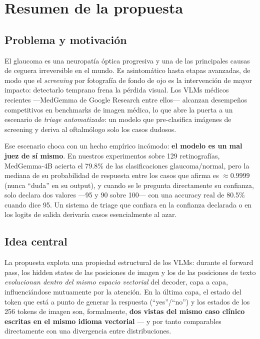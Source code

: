 \documentclass[12pt,a4paper]{article}
\begin{document}
\newpage
\tableofcontents
\newpage

\section{Resumen de la propuesta}

\subsection{Problema y motivación}

El glaucoma es una neuropatía óptica progresiva y una de las principales
causas de ceguera irreversible en el mundo. Es asintomático hasta etapas
avanzadas, de modo que el \emph{screening} por fotografía de fondo de ojo
es la intervención de mayor impacto: detectarlo temprano frena la pérdida
visual. Los VLMs médicos recientes ---MedGemma de Google Research entre
ellos--- alcanzan desempeños competitivos en benchmarks de imagen médica,
lo que abre la puerta a un escenario de \emph{triage automatizado}: un
modelo que pre-clasifica imágenes de screening y deriva al oftalmólogo
solo los casos dudosos.

Ese escenario choca con un hecho empírico incómodo: \textbf{el modelo es
un mal juez de sí mismo}. En nuestros experimentos sobre 129 retinografías,
MedGemma-4B acierta el 79.8\% de las clasificaciones glaucoma/normal, pero
la mediana de su probabilidad de respuesta entre los casos que afirma es
$\approx 0.9999$ (nunca ``duda'' en su output), y cuando se le pregunta
directamente su confianza, solo declara dos valores ---95 y 90 sobre
100--- con una accuracy real de 80.5\% cuando dice 95. Un sistema de triage
que confiara en la confianza declarada o en los logits de salida derivaría
casos esencialmente al azar.

\subsection{Idea central}

La propuesta explota una propiedad estructural de los VLMs: durante el
forward pass, los hidden states de las posiciones de imagen y los de las
posiciones de texto \emph{evolucionan dentro del mismo espacio vectorial}
del decoder, capa a capa, influenciándose mutuamente por la atención. En la
última capa, el estado del token que está a punto de generar la respuesta
(``yes''/``no'') y los estados de los 256 tokens de imagen son, formalmente,
\textbf{dos vistas del mismo caso clínico escritas en el mismo idioma
vectorial} --- y por tanto comparables directamente con una divergencia
entre distribuciones.
\end{document}
